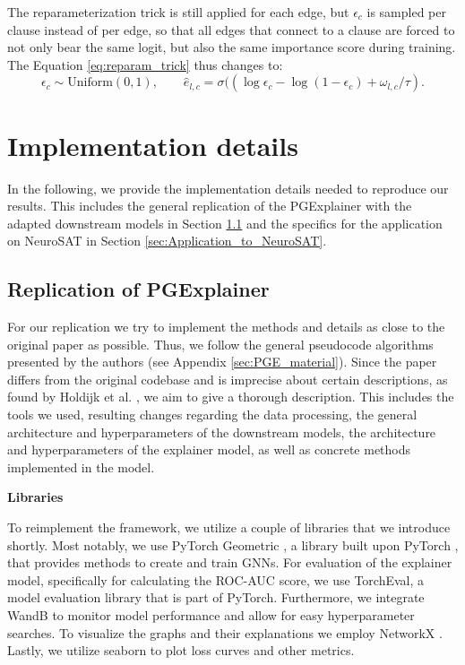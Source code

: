 The reparameterization trick is still applied for each edge, but $\epsilon_c$ is sampled per clause instead of per edge, so that all edges that connect to a clause are forced to not only bear the same logit, but also the same importance score during training. The Equation \ref{eq:reparam_trick} thus changes to:
\begin{equation}
    \epsilon_c \sim \text{Uniform}(0,1), \qquad \hat{e}_{l,c}=\sigma((\log \epsilon_c - \log(1-\epsilon_c)+\omega_{l,c}/\tau).
\end{equation}


\section{Implementation details}
\label{sec:implementation_details}
In the following, we provide the implementation details needed to reproduce our results. This includes the general replication of the PGExplainer \cite{luo2020parameterized} with the adapted downstream models in Section \ref{sec:Replication_of_PGExplainer} and the specifics for the application on NeuroSAT \cite{selsam2018learning} in Section \ref{sec:Application_to_NeuroSAT}.


\subsection{Replication of PGExplainer}
\label{sec:Replication_of_PGExplainer}

For our replication we try to implement the methods and details as close to the original paper as possible. Thus, we follow the general pseudocode algorithms presented by the authors (see Appendix \ref{sec:PGE_material}). Since the paper differs from the original codebase and is imprecise about certain descriptions, as found by Holdijk et al. \cite{holdijk2021re}, we aim to give a thorough description. This includes the tools we used, resulting changes regarding the data processing, the general architecture and hyperparameters of the downstream models, the architecture and hyperparameters of the explainer model, as well as concrete methods implemented in the model. \bigskip

\textbf{Libraries}\par
 To reimplement the framework, we utilize a couple of libraries that we introduce shortly. Most notably, we use PyTorch Geometric \cite{Fey/Lenssen/2019}, a library built upon PyTorch \cite{paszke2019pytorch}, that provides methods to create and train GNNs. For evaluation of the explainer model, specifically for calculating the ROC-AUC score, we use TorchEval, a model evaluation library that is part of PyTorch. Furthermore, we integrate WandB \cite{wandb} to monitor model performance and allow for easy hyperparameter searches. To visualize the graphs and their explanations we employ NetworkX \cite{SciPyProceedings_11}. Lastly, we utilize seaborn \cite{Waskom2021} to plot loss curves and other metrics.\bigskip

